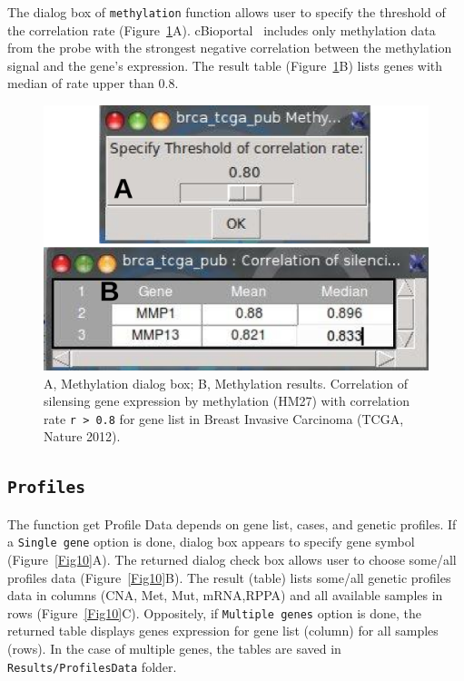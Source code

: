\documentclass[a4paper]{article}
\begin{document}
The dialog box of \texttt{methylation} function allows user to specify the threshold of the correlation rate (Figure~\ref{Fig9}A). cBioportal~\cite{Cerami2012,Gao2013} includes only methylation data from the probe with the strongest negative correlation between the methylation signal and the gene's expression. The result table (Figure~\ref{Fig9}B) lists genes with median of rate upper than 0.8.

\begin{figure}[!ht]
 \centering
\includegraphics[scale=1]{image/methylationResult.png}
\caption{A, Methylation dialog box; B, Methylation results. Correlation of silensing gene expression by methylation (HM27) with correlation rate \texttt{r > 0.8} for gene list in Breast Invasive Carcinoma (TCGA, Nature 2012).}
\label{Fig9}
\end{figure}




\subsection{\texttt{Profiles}}
The function get Profile Data depends on gene list, cases, and genetic profiles. If a \texttt{Single gene} option is done, dialog box appears to specify gene symbol (Figure~\ref{Fig10}A). The returned dialog check box allows user to choose some/all profiles data (Figure~\ref{Fig10}B). The result (table) lists some/all genetic profiles data in columns (CNA, Met, Mut, mRNA,RPPA) and all available samples in rows (Figure~\ref{Fig10}C). Oppositely, if \texttt{Multiple genes} option is done, the returned table displays genes expression for gene list (column) for all samples (rows). In the case of multiple genes, the tables are saved in \texttt{Results/ProfilesData} folder.
\end{document}
